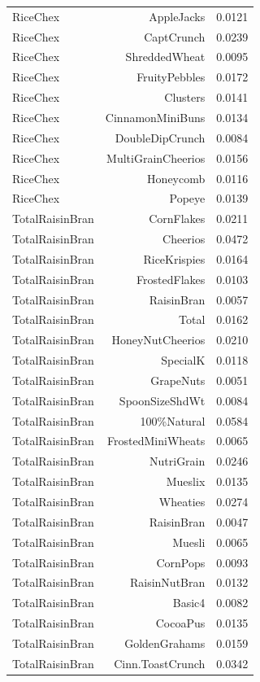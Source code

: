 \begin{longtable}{@{}lrr@{}}
RiceChex & AppleJacks & 0.0121 \\
RiceChex & CaptCrunch & 0.0239 \\
RiceChex & ShreddedWheat & 0.0095 \\
RiceChex & FruityPebbles & 0.0172 \\
RiceChex & Clusters & 0.0141 \\
RiceChex & CinnamonMiniBuns & 0.0134 \\
RiceChex & DoubleDipCrunch & 0.0084 \\
RiceChex & MultiGrainCheerios & 0.0156 \\
RiceChex & Honeycomb & 0.0116 \\
RiceChex & Popeye & 0.0139 \\
TotalRaisinBran & CornFlakes & 0.0211 \\
TotalRaisinBran & Cheerios & 0.0472 \\
TotalRaisinBran & RiceKrispies & 0.0164 \\
TotalRaisinBran & FrostedFlakes & 0.0103 \\
TotalRaisinBran & RaisinBran & 0.0057 \\
TotalRaisinBran & Total & 0.0162 \\
TotalRaisinBran & HoneyNutCheerios & 0.0210 \\
TotalRaisinBran & SpecialK & 0.0118 \\
TotalRaisinBran & GrapeNuts & 0.0051 \\
TotalRaisinBran & SpoonSizeShdWt & 0.0084 \\
TotalRaisinBran & 100\%Natural & 0.0584 \\
TotalRaisinBran & FrostedMiniWheats & 0.0065 \\
TotalRaisinBran & NutriGrain & 0.0246 \\
TotalRaisinBran & Mueslix & 0.0135 \\
TotalRaisinBran & Wheaties & 0.0274 \\
TotalRaisinBran & RaisinBran & 0.0047 \\
TotalRaisinBran & Muesli & 0.0065 \\
TotalRaisinBran & CornPops & 0.0093 \\
TotalRaisinBran & RaisinNutBran & 0.0132 \\
TotalRaisinBran & Basic4 & 0.0082 \\
TotalRaisinBran & CocoaPus & 0.0135 \\
TotalRaisinBran & GoldenGrahams & 0.0159 \\
TotalRaisinBran & Cinn.ToastCrunch & 0.0342 \\

\end{longtable}
